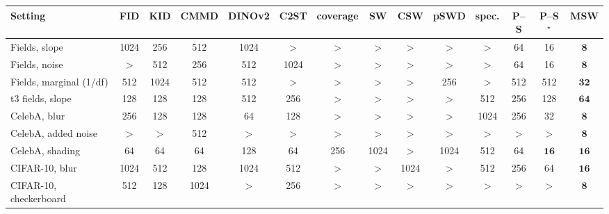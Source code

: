 \begin{tabular}{lccccccccccccc}
\toprule
Setting & FID & KID & CMMD & DINOv2 & C2ST & coverage & SW & CSW & pSWD & spec. & P--S & P--S$^\star$ & MSW \\
\midrule
Fields, slope & 1024 & 256 & 512 & 1024 & $>$ & $>$ & $>$ & $>$ & $>$ & $>$ & 64 & 16 & $\mathbf{8}$ \\
Fields, noise & $>$ & 512 & 256 & 512 & 1024 & $>$ & $>$ & $>$ & $>$ & $>$ & 64 & 16 & $\mathbf{8}$ \\
Fields, marginal (1/df) & 512 & 1024 & 512 & 512 & $>$ & $>$ & $>$ & $>$ & 256 & $>$ & 512 & 512 & $\mathbf{32}$ \\
t3 fields, slope & 128 & 128 & 128 & 512 & 256 & $>$ & $>$ & $>$ & $>$ & 512 & 256 & 128 & $\mathbf{64}$ \\
CelebA, blur & 256 & 128 & 128 & 64 & 128 & $>$ & $>$ & $>$ & $>$ & 1024 & 256 & 32 & $\mathbf{8}$ \\
CelebA, added noise & $>$ & $>$ & 512 & $>$ & $>$ & $>$ & $>$ & $>$ & $>$ & $>$ & $>$ & $>$ & $\mathbf{8}$ \\
CelebA, shading & 64 & 64 & 64 & 128 & 64 & 256 & 1024 & $>$ & 1024 & 512 & 64 & $\mathbf{16}$ & $\mathbf{16}$ \\
CIFAR-10, blur & 1024 & 512 & 128 & 1024 & 512 & $>$ & $>$ & 1024 & $>$ & 512 & 256 & 64 & $\mathbf{16}$ \\
CIFAR-10, checkerboard & 512 & 128 & 1024 & $>$ & 256 & $>$ & $>$ & $>$ & $>$ & $>$ & $>$ & $>$ & $\mathbf{8}$ \\
\bottomrule
\end{tabular}
